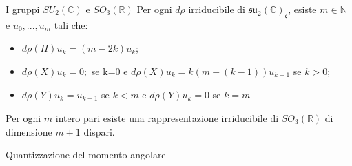 \documentclass{beamer}
\theoremstyle{definition}
\theoremstyle{Theorem}
\theoremstyle{definition}
\theoremstyle{definition}
\theoremstyle{definition}
\begin{document}
\begin{frame} {I gruppi $SU_2(\mathbb{C})$ e $SO_3(\mathbb{R})$}
	Per ogni $d\rho$ irriducibile di $\mathfrak{su_2(\mathbb{C})_c}$, esiste $m\in \mathbb{N}$ e $u_0,...,u_m$ tali che:
	\begin{itemize}
		\item $d\rho(H)u_k=(m-2k)u_k$;
		\item $d\rho(X)u_k=0;$ se k=0 e $d\rho(X)u_k=k(m-(k-1))u_{k-1}$ se $k>0$;
		\item $d\rho(Y)u_k=u_{k+1}$ se $k<m$ e $d\rho(Y)u_k=0$ se $k=m$
	\end{itemize}
	\begin{alertblock}{}
		Per ogni $m$ intero pari esiste una rappresentazione irriducibile di $SO_3(\mathbb{R})$ di dimensione $m+1$ dispari.
	\end{alertblock}
\end{frame}
\begin{frame}{Quantizzazione del momento angolare}
	
\end{frame}
\end{document}
